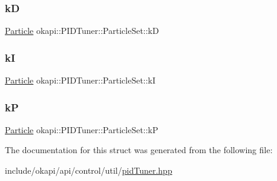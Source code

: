 \subsubsection{\texorpdfstring{kD}{kD}}
{\footnotesize\ttfamily \mbox{\hyperlink{structokapi_1_1PIDTuner_1_1Particle}{Particle}} okapi\+::\+P\+I\+D\+Tuner\+::\+Particle\+Set\+::kD}

\mbox{\label{structokapi_1_1PIDTuner_1_1ParticleSet_a94c29f71c13dd7f9e32fb8f7034f0ebc}} 
\subsubsection{\texorpdfstring{kI}{kI}}
{\footnotesize\ttfamily \mbox{\hyperlink{structokapi_1_1PIDTuner_1_1Particle}{Particle}} okapi\+::\+P\+I\+D\+Tuner\+::\+Particle\+Set\+::kI}

\mbox{\label{structokapi_1_1PIDTuner_1_1ParticleSet_ab03d8e49c5aab69a7155485a6b59c60c}} 
\subsubsection{\texorpdfstring{kP}{kP}}
{\footnotesize\ttfamily \mbox{\hyperlink{structokapi_1_1PIDTuner_1_1Particle}{Particle}} okapi\+::\+P\+I\+D\+Tuner\+::\+Particle\+Set\+::kP}



The documentation for this struct was generated from the following file\+:\begin{DoxyCompactItemize}
\item 
include/okapi/api/control/util/\mbox{\hyperlink{pidTuner_8hpp}{pid\+Tuner.\+hpp}}\end{DoxyCompactItemize}
